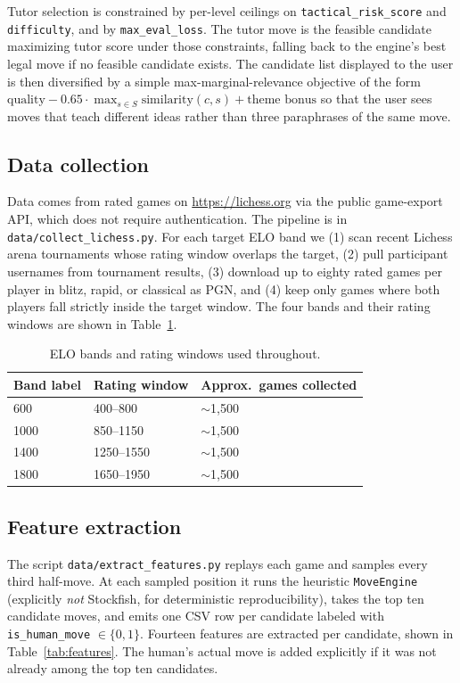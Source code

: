 \documentclass[11pt]{article}
\begin{document}
Tutor selection is constrained by per-level ceilings on \texttt{tactical\_risk\_score} and \texttt{difficulty}, and by \texttt{max\_eval\_loss}. The tutor move is the feasible candidate maximizing tutor score under those constraints, falling back to the engine's best legal move if no feasible candidate exists. The candidate list displayed to the user is then diversified by a simple max-marginal-relevance objective of the form $\text{quality} - 0.65 \cdot \max_{s \in S} \text{similarity}(c, s) + \text{theme bonus}$ so that the user sees moves that teach different ideas rather than three paraphrases of the same move.

\subsection{Data collection}
Data comes from rated games on \url{https://lichess.org} via the public game-export API, which does not require authentication. The pipeline is in \texttt{data/collect\_lichess.py}. For each target ELO band we (1) scan recent Lichess arena tournaments whose rating window overlaps the target, (2) pull participant usernames from tournament results, (3) download up to eighty rated games per player in blitz, rapid, or classical as PGN, and (4) keep only games where both players fall strictly inside the target window. The four bands and their rating windows are shown in Table~\ref{tab:bands}.

\begin{table}[h]
\centering
\caption{ELO bands and rating windows used throughout.}
\label{tab:bands}
\begin{tabular}{@{}lll@{}}
\toprule
Band label & Rating window & Approx.\ games collected \\
\midrule
600  & 400--800   & $\sim$1{,}500 \\
1000 & 850--1150  & $\sim$1{,}500 \\
1400 & 1250--1550 & $\sim$1{,}500 \\
1800 & 1650--1950 & $\sim$1{,}500 \\
\bottomrule
\end{tabular}
\end{table}

\subsection{Feature extraction}
The script \texttt{data/extract\_features.py} replays each game and samples every third half-move. At each sampled position it runs the heuristic \texttt{MoveEngine} (explicitly \emph{not} Stockfish, for deterministic reproducibility), takes the top ten candidate moves, and emits one CSV row per candidate labeled with \texttt{is\_human\_move} $\in \{0,1\}$. Fourteen features are extracted per candidate, shown in Table~\ref{tab:features}. The human's actual move is added explicitly if it was not already among the top ten candidates.
\end{document}
